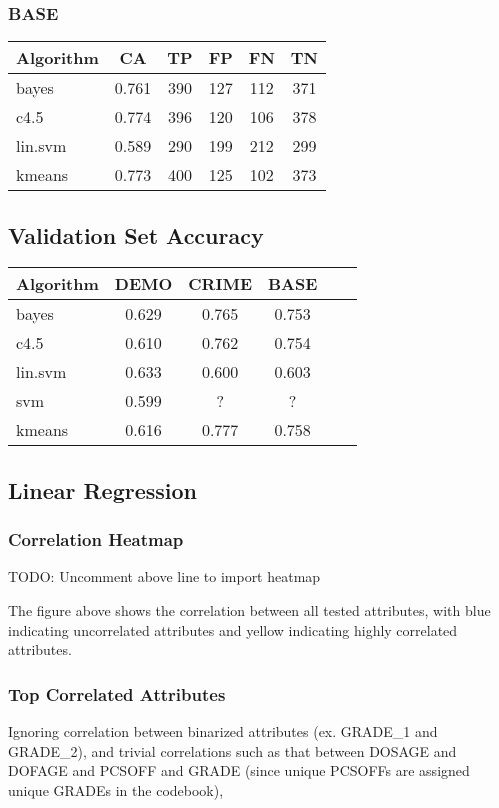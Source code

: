\documentclass[]{article}
\begin{document}
\subsubsection{BASE}
\begin{tabular}{|l|c|c|c|c|c|}
\hline
Algorithm & CA & TP & FP & FN & TN \\
\hline
bayes   & 0.761  &  390  &  127  &  112  &  371  \\
c4.5    & 0.774  &  396  &  120  &  106  &  378  \\
lin.svm & 0.589  &  290  &  199  &  212  &  299  \\
kmeans  & 0.773  &  400  &  125  &  102  &  373  \\
\hline
\end{tabular}

\subsection{Validation Set Accuracy}
\begin{tabular}{|l|c|c|c|c|c|}
\hline
Algorithm & DEMO & CRIME & BASE \\
\hline
bayes  &  0.629 & 0.765  &  0.753   \\
c4.5   &  0.610 & 0.762  &  0.754  \\
lin.svm & 0.633 & 0.600  &  0.603   \\
svm & 0.599 & ? & ? \\
kmeans  & 0.616 & 0.777  &  0.758   \\
\hline
\end{tabular}

\subsection{Linear Regression}

\subsubsection{Correlation Heatmap}

TODO: Uncomment above line to import heatmap

The figure above shows the correlation between all tested attributes, 
with blue indicating uncorrelated attributes and yellow indicating highly correlated attributes.

\subsubsection{Top Correlated Attributes}
Ignoring correlation between binarized attributes (ex. GRADE\_1 and GRADE\_2), 
and trivial correlations such as that between DOSAGE and DOFAGE and PCSOFF and GRADE (since unique PCSOFFs are assigned unique GRADEs in the codebook),
\end{document}
